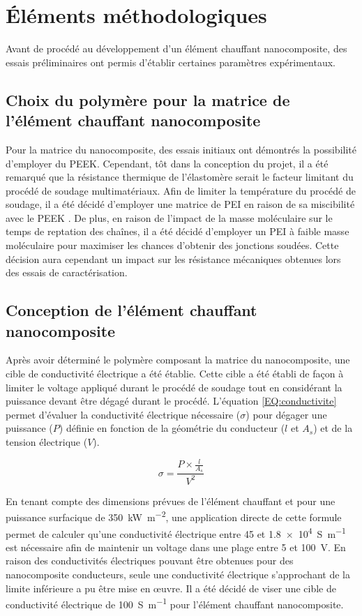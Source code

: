 \section{Éléments méthodologiques}

Avant de procédé au développement d'un élément chauffant nanocomposite, des essais préliminaires ont permis d'établir certaines paramètres expérimentaux. 

\subsection{Choix du polymère pour la matrice de l'élément chauffant nanocomposite}

Pour la matrice du nanocomposite, des essais initiaux ont démontrés la possibilité d'employer du PEEK. 
Cependant, tôt dans la conception du projet, il a été remarqué que la résistance thermique de l'élastomère serait le facteur limitant du procédé de soudage multimatériaux. 
Afin de limiter la température du procédé de soudage, il a été décidé d'employer une matrice de PEI en raison de sa miscibilité avec le PEEK \cite{Torre1992,Crevecoeur1991}. 
De plus, en raison de l'impact de la masse moléculaire sur le temps de reptation des chaînes, il a été décidé d'employer un PEI à faible masse moléculaire pour maximiser les chances d'obtenir des jonctions soudées. 
Cette décision aura cependant un impact sur les résistance mécaniques obtenues lors des essais de caractérisation. 

\subsection{Conception de l'élément chauffant nanocomposite}

Après avoir déterminé le polymère composant la matrice du nanocomposite, une cible de conductivité électrique a été établie. 
Cette cible a été établi de façon à limiter le voltage appliqué durant le procédé de soudage tout en considérant la puissance devant être dégagé durant le procédé. 
L'équation \ref{EQ:conductivite} permet d'évaluer la conductivité électrique nécessaire ($\sigma$) pour dégager une puissance ($P$) définie en fonction de la géométrie du conducteur ($l$ et $A_s$) et de la tension électrique ($V$). 

\begin{equation}
\label{EQ:conductivite}
\sigma = \frac{P \times \frac{l}{A_s}}{V^2}
\end{equation} 

En tenant compte des dimensions prévues de l'élément chauffant et pour une puissance surfacique de \SI[locale=FR]{350}{\kilo\watt\per\square\metre}, une application directe de cette formule permet de calculer qu'une conductivité électrique entre 45 et \SI[locale=FR]{1,8e4}{\siemens\per\metre} est nécessaire afin de maintenir un voltage dans une plage entre 5 et \SI[locale=FR]{100}{\volt}. 
En raison des conductivités électriques pouvant être obtenues pour des nanocomposite conducteurs, seule une conductivité électrique s'approchant de la limite inférieure a pu être mise en œuvre. 
Il a été décidé de viser une cible de conductivité électrique de \SI[locale=FR]{100}{\siemens\per\metre} pour l'élément chauffant nanocomposite. 

